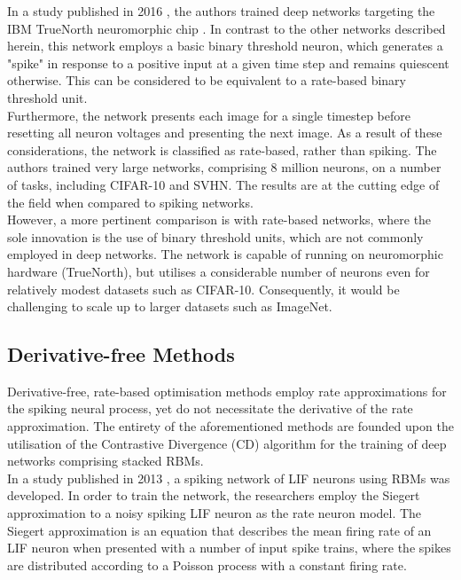 \noindent In a study published in 2016 \cite{esser2015backpropagation}, the authors trained deep networks targeting the IBM TrueNorth neuromorphic chip \cite{merolla2014million}. In contrast to the other networks described herein, this network employs a basic binary threshold neuron, which generates a "spike" in response to a positive input at a given time step and remains quiescent otherwise. This can be considered to be equivalent to a rate-based binary threshold unit. \\

\noindent Furthermore, the network presents each image for a single timestep before resetting all neuron voltages and presenting the next image. As a result of these considerations, the network is classified as rate-based, rather than spiking.  The authors trained very large networks, comprising 8 million neurons, on a number of tasks, including CIFAR-10 and SVHN. The results are at the cutting edge of the field when compared to spiking networks. \\

\noindent However, a more pertinent comparison is with rate-based networks, where the sole innovation is the use of binary threshold units, which are not commonly employed in deep networks. The network is capable of running on neuromorphic hardware (TrueNorth), but utilises a considerable number of neurons even for relatively modest datasets such as CIFAR-10. Consequently, it would be challenging to scale up to larger datasets such as ImageNet. 

\subsection[Derivative-free Methods]{Derivative-free Methods}

\noindent Derivative-free, rate-based optimisation methods employ rate approximations for the spiking neural process, yet do not necessitate the derivative of the rate approximation. The entirety of the aforementioned methods are founded upon the utilisation of the Contrastive Divergence (CD) algorithm \cite{hinton2006fast} for the training of deep networks comprising stacked RBMs. \\

\noindent In a study published in 2013 \cite{o2013real}, a spiking network of LIF neurons using RBMs was developed. In order to train the network, the researchers employ the Siegert approximation to a noisy spiking LIF neuron as the rate neuron model. The Siegert approximation is an equation that describes the mean firing rate of an LIF neuron when presented with a number of input spike trains, where the spikes are distributed according to a Poisson process with a constant firing rate. \\

